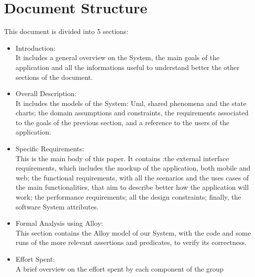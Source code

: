 \section{Document Structure}
This document is divided into 5 sections:
\begin{itemize}
\item Introduction:\\
It includes a general overview on the System, the main goals of the application and all the informations useful to understand better the other sections of the document.

\item Overall Description:\\
It includes the models of the System: Uml, shared phenomena and the state charts; the domain assumptions and constraints, the requirements associated to the goals of the previous section, and a reference to the users of the application.

\item Specific Requirements: \\
This is the main body of this paper. It contains :the external interface requirements, which includes the mockup of the application, both mobile and web; the functional requirements, with all the scenarios and the uses cases of the main functionalities, that aim to describe better how
the application will work; the performance requirements; all the design constraints; finally,  the software System attributes.

\item Formal Analysis using Alloy: \\
This section contains the Alloy model of our System, with the code and some runs of the more relevant assertions and predicates, to verify its correctness.

\item Effort Spent:\\
A brief overview on the effort spent by each component of the group




\end{itemize}